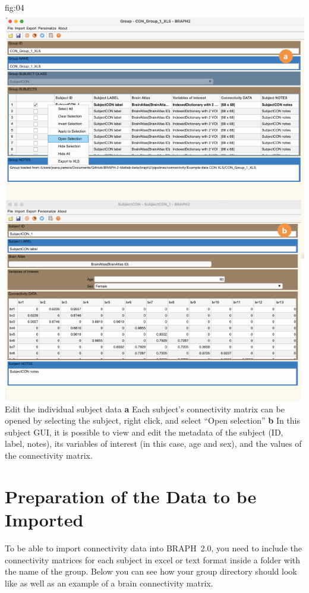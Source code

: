 \documentclass[justified]{tufte-handout}
\begin{document}
	{fig:04}
	{\includegraphics{fig04}
	}
	{Edit the individual subject data}
	{
	{\bf a}  Each subject's connectivity matrix can be opened by selecting the subject, right click, and select ``Open selection''
	{\bf b} In this subject GUI, it is possible to view and edit the metadata of the subject (ID, label, notes), its variables of interest (in this case, age and sex), and the values of the connectivity matrix. 
	}

\clearpage
\section{Preparation of the Data to be Imported}

To be able to import connectivity data into BRAPH~2.0, you need to include the connectivity matrices for each subject in excel or text format inside a folder with the name of the group. Below you can see how your group directory should look like as well as an example of a brain connectivity matrix.
\end{document}
